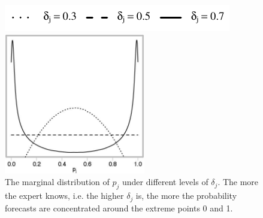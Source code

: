 \documentclass[11pt,twoside]{article}
\theoremstyle{definition}
\theoremstyle{definition}
\begin{document}
\begin{figure}[t]
\centering
	\hspace{0em}\includegraphics{LegendMarginal}

 \includegraphics[width= 0.55\textwidth]{Marginals}
   \caption{The marginal distribution of $p_j$ under different levels of $\delta_j$. The more the expert knows, i.e. the higher $\delta_j$ is, the more the probability forecasts are concentrated around the extreme points 0 and 1.}
\label{marginals}
\end{figure}









\end{document}
